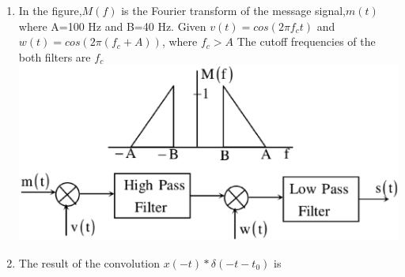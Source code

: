 \documentclass[journal,12pt,twocolumn]{IEEEtran}
\begin{document}
\begin{enumerate}[1.]
\item In the figure,$M(f)$ is the Fourier transform of the message signal,$m(t)$ where A=100 Hz and B=40 Hz. Given $v(t)=cos(2\pi f_c t)$ and $w(t)=cos(2\pi (f_c +A))$, where $f_c > A$ The cutoff frequencies of the both filters are \underline{\hspace{2cm}} $f_c$\\
\includegraphics[scale=0.3]{fig18.eps}


\item The result of the convolution $x(-t)*\delta(-t-t_0)$ is
\begin{enumerate}[(A)]

\end{enumerate}

\end{enumerate}
\end{document}
